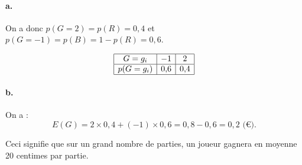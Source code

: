 \paragraph{a.} On a donc \(p(G = 2) = p(R) = 0{,}4\) et \(p(G = -1) = p(B) = 1 - p(R) = 0{,}6\).

\[
\begin{array}{|c|c|c|}
\hline
G = g_i & -1 & 2 \\
\hline
p(G = g_i) & 0{,}6 & 0{,}4 \\
\hline
\end{array}
\]

\paragraph{b.} On a :
\[
E(G) = 2 \times 0{,}4 + (-1) \times 0{,}6 = 0{,}8 - 0{,}6 = 0{,}2 \text{ (€)}.
\]

Ceci signifie que sur un grand nombre de parties, un joueur gagnera en moyenne 20 centimes par partie.
